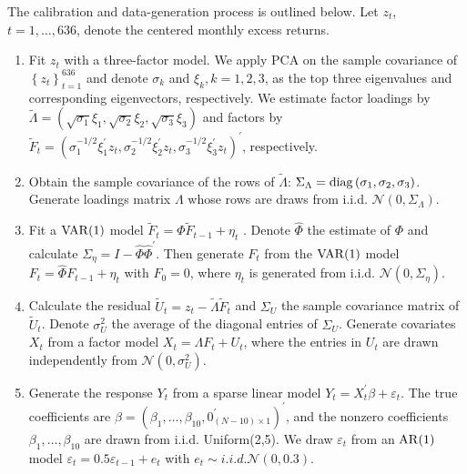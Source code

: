 ﻿\documentclass[12pt]{article}
\newcommand{\0}{\mbox{\bf 0}}
\theoremstyle{plain}%
\theoremstyle{definition}
\def\func#1{\mathop{\rm #1}}%
\begin{document}
{{\color{minorrevisionred}The calibration and data-generation process is
outlined below. Let $z_t$, $t=1,\ldots,636$, denote the centered monthly
excess returns.}

\begin{enumerate}
\item Fit $z_t$ with a three-factor model. We apply PCA on the sample
covariance of $\left\{z_t\right\}_{t=1}^{636}$ and denote $\sigma_k$ and $%
\xi_k, k=1,2,3$, as the top three eigenvalues and corresponding
eigenvectors, respectively. We estimate factor loadings by $\tilde{\Lambda}%
=\left(\sqrt{\sigma_1} \xi_1, \sqrt{\sigma_2} \xi_2, \sqrt{\sigma_3}
\xi_3\right)$ and factors by $\tilde{F}_t=\left(\sigma_1^{-1 / 2}
\xi^{\prime}_1 z_t, \sigma_2^{-1 / 2} \xi^{\prime}_2 z_t, \sigma_3^{-1 / 2}
\xi^{\prime}_3 z_t\right)^{\prime}$, respectively.

\item Obtain the sample covariance of the rows of $\tilde{\Lambda}$: $%
\Sigma_{\Lambda}=\func{diag}\left(\sigma_1, \sigma_2, \sigma_3\right)$.
Generate loadings matrix $\Lambda$ whose rows are draws from i.i.d. $%
\mathcal{N}\left(0, \Sigma_{\Lambda}\right)$.

\item Fit a $\func{VAR}(1)$ model $\tilde{F}_t= \Phi \tilde{F}_{t-1}+ \eta_t$%
. Denote $\widehat{ \Phi}$ the estimate of $\Phi$ and calculate $%
\Sigma_{\eta}= I -\widehat{ \Phi } \widehat{ \Phi }^{\prime}$. Then generate 
$F_t$ from the $\func{VAR}(1)$ model $F_t=\widehat{ \Phi } F_{t-1}+ \eta_t$
with $F_0=0$, where $\eta_t$ is generated from i.i.d. $\mathcal{N}\left(0,
\Sigma_{\eta}\right)$.

\item Calculate the residual $\tilde{U}_t=z_t-\tilde{\Lambda}\tilde{F}_t$
and $\Sigma_{U}$ the sample covariance matrix of $\tilde{U}_t$. Denote $%
\sigma_U^2$ the average of the diagonal entries of $\Sigma_{U}$. Generate
covariates $X_t$ from a factor model $X_t=\Lambda F_{t} + U_t$, where the
entries in $U_t$ are drawn independently from $\mathcal{N}(0, \sigma_U^2) $.

\item Generate the response $Y_t$ from a sparse linear model $%
Y_t=X^{\prime}_t \beta +\varepsilon_t$. The true coefficients are $\beta =
\left(\beta_{1}, \ldots, \beta_{10},
0^{\prime}_{(N-10)\times1}\right)^{\prime}$, and the nonzero coefficients $%
\beta_1, \ldots, \beta_{10}$ are drawn from i.i.d. Uniform(2,5). We draw $%
\varepsilon_t$ from an $\func{AR}(1)$ model $\varepsilon_t=0.5
\varepsilon_{t-1}+e_t$ with $e_t \sim i.i.d. \mathcal{N}(0,0.3)$.
\end{enumerate}


}
\end{document}
